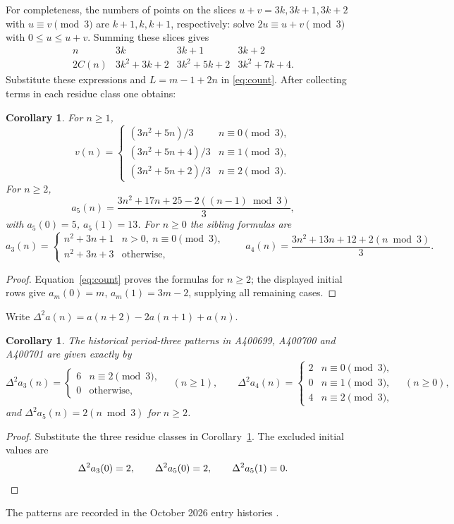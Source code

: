 \documentclass[11pt]{article}
\newtheorem{corollary}[theorem]{Corollary}
\begin{document}
For completeness, the numbers of points on the slices $u+v=3k,3k+1,3k+2$
with $u\equiv v\pmod3$ are $k+1,k,k+1$, respectively: solve
$2u\equiv u+v\pmod3$ with $0\leq u\leq u+v$.
Summing these slices gives
\[
\begin{array}{c|ccc}
n&3k&3k+1&3k+2\\\hline
2C(n)&3k^2+3k+2&3k^2+5k+2&3k^2+7k+4.
\end{array}
\]
Substitute these expressions and $L=m-1+2n$ in \eqref{eq:count}.
After collecting terms in each residue class one obtains:
\begin{corollary}\label{cor:formulas}
For $n\geq1$,
\[
v(n)=\begin{cases}
(3n^2+5n)/3&n\equiv0\pmod3,\\
(3n^2+5n+4)/3&n\equiv1\pmod3,\\
(3n^2+5n+2)/3&n\equiv2\pmod3.
\end{cases}
\]
For $n\geq2$,
\[
a_5(n)=\frac{3n^2+17n+25-2((n-1)\bmod3)}3,
\]
with $a_5(0)=5$, $a_5(1)=13$. For $n\geq0$ the sibling formulas are
\[
a_3(n)=\begin{cases}n^2+3n+1&n>0,\ n\equiv0\pmod3,\\
n^2+3n+3&\text{otherwise},\end{cases}
\qquad
a_4(n)=\frac{3n^2+13n+12+2(n\bmod3)}3.
\]
\end{corollary}
\begin{proof}
Equation~\eqref{eq:count} proves the formulas for $n\geq2$; the displayed
initial rows give $a_m(0)=m$, $a_m(1)=3m-2$, supplying all remaining cases.
\end{proof}
Write $\Delta^2a(n)=a(n+2)-2a(n+1)+a(n)$.
\begin{corollary}\label{cor:second}
The historical period-three patterns in A400699, A400700 and A400701
are given exactly by
\[
 \Delta^2a_3(n)=\begin{cases}6&n\equiv2\pmod3,\\0&\text{otherwise},\end{cases}
 \quad(n\geq1),\qquad
 \Delta^2a_4(n)=\begin{cases}2&n\equiv0\pmod3,\\0&n\equiv1\pmod3,\\4&n\equiv2\pmod3,\end{cases}
 \quad(n\geq0),
\]
and $\Delta^2a_5(n)=2(n\bmod3)$ for $n\geq2$.
\end{corollary}
\begin{proof}
Substitute the three residue classes in Corollary~\ref{cor:formulas}.
The excluded initial values are
\[
 \Delta^2a_3(0)=2,\qquad \Delta^2a_5(0)=2,\qquad
 \Delta^2a_5(1)=0.\qedhere
\]
\end{proof}
The patterns are recorded in the October 2026 entry histories
\cite{markey,three,four}.
\end{document}
